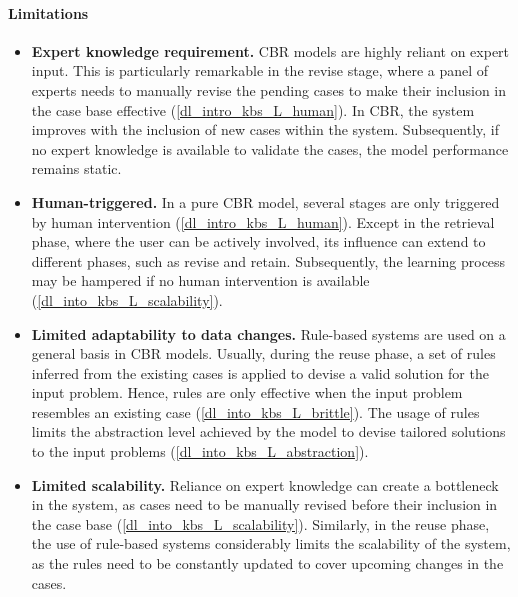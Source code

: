 \paragraph{Limitations}
\begin{itemize}
    \item \textbf{Expert knowledge requirement.} CBR models are highly reliant on expert input. This is particularly remarkable in the revise stage, where a panel of experts needs to manually revise the pending cases to make their inclusion in the case base effective (\ref{dl_intro_kbs_L_human}). In CBR, the system improves with the inclusion of new cases within the system. Subsequently, if no expert knowledge is available to validate the cases, the model performance remains static. 
    
    \item \textbf{Human-triggered.} In a pure CBR model, several stages are only triggered by human intervention (\ref{dl_intro_kbs_L_human}). Except in the retrieval phase, where the user can be actively involved, its influence can extend to different phases, such as revise and retain. Subsequently, the learning process may be hampered if no human intervention is available (\ref{dl_into_kbs_L_scalability}).
    
    \item \textbf{Limited adaptability to data changes.} Rule-based systems are used on a general basis in CBR models. Usually, during the reuse phase, a set of rules inferred from the existing cases is applied to devise a valid solution for the input problem. Hence, rules are only effective when the input problem resembles an existing case (\ref{dl_into_kbs_L_brittle}). The usage of rules limits the abstraction level achieved by the model to devise tailored solutions to the input problems (\ref{dl_into_kbs_L_abstraction}).
    
    \item \textbf{Limited scalability.} Reliance on expert knowledge can create a bottleneck in the system, as cases need to be manually revised before their inclusion in the case base (\ref{dl_into_kbs_L_scalability}). Similarly, in the reuse phase, the use of rule-based systems considerably limits the scalability of the system, as the rules need to be constantly updated to cover upcoming changes in the cases.
    
    
\end{itemize}
